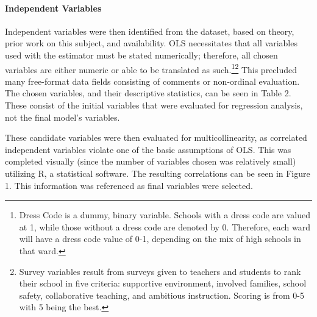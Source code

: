 \documentclass[12pt]{article}
\begin{document}
\paragraph{Independent Variables}
Independent variables were then identified from the dataset, based on theory, prior work on this subject, and availability.  OLS necessitates that all variables used with the estimator must be stated numerically; therefore, all chosen variables are either numeric or able to be translated as such.\footnote{Dress Code is a dummy, binary variable.  Schools with a dress code are valued at 1, while those without a dress code are denoted by 0.  Therefore, each ward will have a dress code value of 0-1, depending on the mix of high schools in that ward.}\footnote{Survey variables result from surveys given to teachers and students to rank their school in five criteria:  supportive environment, involved families, school safety, collaborative teaching, and ambitious instruction.  Scoring is from 0-5 with 5 being the best.}  This precluded many free-format data fields consisting of comments or non-ordinal evaluation.  The chosen variables, and their descriptive statistics, can be seen in Table 2.  These consist of the initial variables that were evaluated for regression analysis, not the final model's variables.
\par
These candidate variables were then evaluated for multicollinearity, as correlated independent variables violate one of the basic assumptions of OLS.  This was completed visually (since the number of variables chosen was relatively small) utilizing R, a statistical software.  The resulting correlations can be seen in Figure 1.  This information was referenced as final variables were selected.
\end{document}
